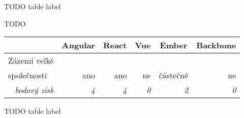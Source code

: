 TODO table label

TODO

\begin{table}[H]
\begin{tabular}{lrrrrr}
\hline
                                         & \multicolumn{1}{c}{Angular} & \multicolumn{1}{c}{React} & \multicolumn{1}{c}{Vue} & \multicolumn{1}{c}{Ember} & \multicolumn{1}{c}{Backbone} \\ \hline
Zázemí velké\\společnosti                & ano                         & ano                       & ne                      & částečně                  & ne                           \\
\multicolumn{1}{r}{\textit{bodový zisk}} & \textit{4}                  & \textit{4}                & \textit{0}              & \textit{2}                & \textit{0}                  
\end{tabular}
\end{table}

TODO table label


